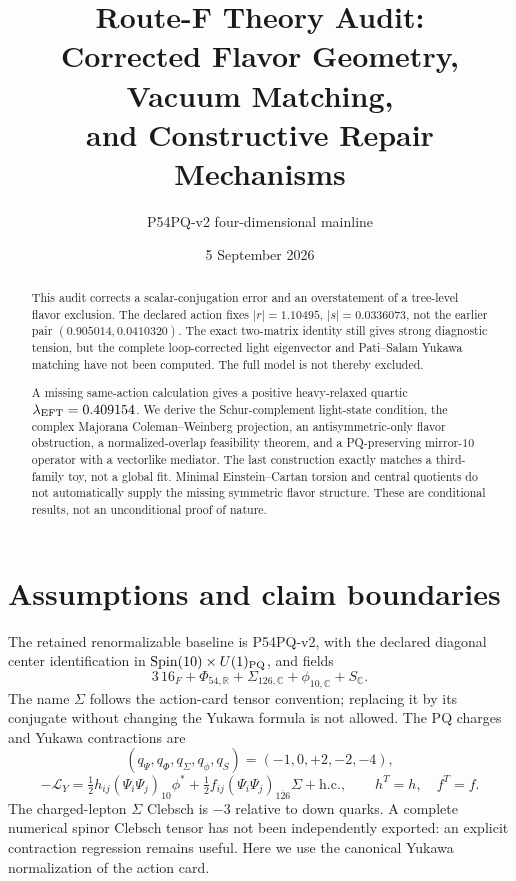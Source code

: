 \documentclass[11pt]{article}
\title{Route-F Theory Audit:\\Corrected Flavor Geometry, Vacuum Matching,\\and Constructive Repair Mechanisms}
\author{P54PQ-v2 four-dimensional mainline}
\date{5 September 2026}
\begin{document}
\maketitle
\begin{abstract}
This audit corrects a scalar-conjugation error and an overstatement of a
tree-level flavor exclusion. The declared action fixes $|r|=1.10495$,
$|s|=0.0336073$, not the earlier pair $(0.905014,0.0410320)$.
The exact two-matrix identity still gives strong diagnostic tension, but
the complete loop-corrected light eigenvector and Pati--Salam Yukawa
matching have not been computed. The full model is not thereby excluded.

A missing same-action calculation gives a positive heavy-relaxed quartic
$\lambda_{\rm EFT}=0.409154$. We derive the Schur-complement light-state
condition, the complex Majorana Coleman--Weinberg projection, an
antisymmetric-only flavor obstruction, a normalized-overlap feasibility
theorem, and a PQ-preserving mirror-$10$ operator with a vectorlike
mediator. The last construction exactly matches a third-family toy, not
a global fit. Minimal Einstein--Cartan torsion and central quotients do
not automatically supply the missing symmetric flavor structure.
These are conditional results, not an unconditional proof of nature.
\end{abstract}
\tableofcontents
\clearpage

\section{Assumptions and claim boundaries}
The retained renormalizable baseline is P54PQ-v2, with the declared
diagonal center identification in $\mathrm{Spin}(10)\times U(1)_{\rm PQ}$,
and fields
\[
3\,16_F+\Phi_{54,\mathbb R}+\Sigma_{126,\mathbb C}
+\phi_{10,\mathbb C}+S_{\mathbb C}.
\]
The name $\Sigma$ follows the action-card tensor convention; replacing it
by its conjugate without changing the Yukawa formula is not allowed.
The PQ charges and Yukawa contractions are
\begin{equation}
(q_\Psi,q_\Phi,q_\Sigma,q_\phi,q_S)=(-1,0,+2,-2,-4),
\end{equation}
\begin{equation}
-\mathcal L_Y=\tfrac12h_{ij}(\Psi_i\Psi_j)_{10}\phi^*
+\tfrac12f_{ij}(\Psi_i\Psi_j)_{\overline{126}}\Sigma+\mathrm{h.c.},
\qquad h^T=h,\quad f^T=f.
\label{eq:action}
\end{equation}
The charged-lepton $\Sigma$ Clebsch is $-3$ relative to down quarks.
A complete numerical spinor Clebsch tensor has not been independently
exported: an explicit contraction regression remains useful. Here we use
the canonical Yukawa normalization of the action card.
\end{document}
